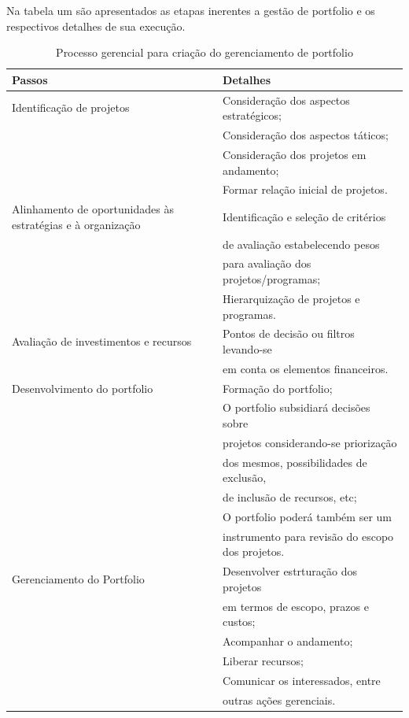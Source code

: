 \documentclass[12pt,a4paper,ruledheader,tocpage=prefix,floatnumber=continuous,pagestart=folhaderosto,font=times]{abnt}
\begin{document}
Na tabela um são apresentados as etapas inerentes a gestão de portfolio e os respectivos detalhes de sua execução.

\begin{table}[H]
\begin{center}
 \begin{tabular}{| >{\centering\arraybackslash}m{2in} | >{\centering\arraybackslash}m{4in} |}
  \hline
  Passos & Detalhes \\
  \hline
  Identificação de projetos & Consideração dos aspectos estratégicos; \\
			    & Consideração dos aspectos táticos; \\
                            & Consideração dos projetos em andamento; \\
			    & Formar relação inicial de projetos. \\
  \hline
  Alinhamento de oportunidades às estratégias e à organização & Identificação e seleção  de critérios\\ 
							      & de avaliação estabelecendo pesos\\
							      & para avaliação dos projetos/programas;\\
							      & Hierarquização de projetos e programas.\\    
  \hline
  Avaliação de investimentos e recursos  & Pontos de decisão ou filtros levando-se\\
					 & em conta os elementos financeiros.\\
  \hline
  Desenvolvimento do portfolio & Formação do portfolio;\\ 
			       & O portfolio subsidiará decisões sobre\\
                               & projetos considerando-se priorização\\
			       & dos mesmos, possibilidades de exclusão,\\
                               & de inclusão de recursos, etc;\\
			       & O portfolio poderá também ser um\\
		               & instrumento para revisão do escopo dos projetos.\\
  \hline
  Gerenciamento do Portfolio   & Desenvolver estrturação dos projetos\\
			       & em termos de escopo, prazos e custos;\\
                               & Acompanhar o andamento;\\
                               & Liberar recursos;\\
                               & Comunicar os interessados, entre\\
			       & outras ações gerenciais.\\			      
  \hline			
 \end{tabular}
\caption{Processo gerencial para criação do gerenciamento de portfolio\cite{CRAWFORD2002}}
\end{center}
\end{table}
\end{document}
